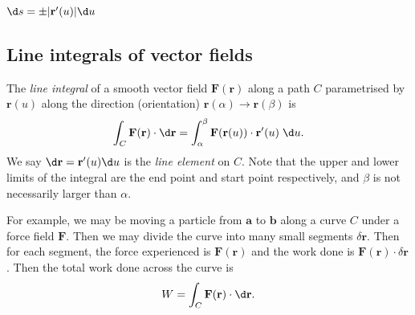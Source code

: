 \documentclass[a4paper]{article}
\begin{document}
\begin{prop}
  $\d s = \pm |\mathbf{r}'(u)| \d u$
\end{prop}
\subsection{Line integrals of vector fields}
\begin{defi}
  The \emph{line integral} of a smooth vector field $\mathbf{F}(\mathbf{r})$ along a path $C$ parametrised by $\mathbf{r}(u)$ along the direction (orientation) $ \mathbf{r}(\alpha)\to \mathbf{r}(\beta)$ is
  \[
    \int_C \mathbf{F}(\mathbf{r})\cdot \d \mathbf{r} = \int_\alpha^\beta \mathbf{F}(\mathbf{r}(u))\cdot \mathbf{r}'(u)\; \d u.
  \]
  We say $\d \mathbf{r} = \mathbf{r}'(u) \d u$ is the \emph{line element} on $C$. Note that the upper and lower limits of the integral are the end point and start point respectively, and $\beta$ is not necessarily larger than $\alpha$.
\end{defi}
For example, we may be moving a particle from $\mathbf{a}$ to $\mathbf{b}$ along a curve $C$ under a force field $\mathbf{F}$. Then we may divide the curve into many small segments $\delta \mathbf{r}$. Then for each segment, the force experienced is $\mathbf{F}(\mathbf{r})$ and the work done is $\mathbf{F}(\mathbf{r})\cdot \delta\mathbf{r}$. Then the total work done across the curve is
\[
  W = \int_C \mathbf{F}(\mathbf{r})\cdot \d \mathbf{r}.
\]
\end{document}
